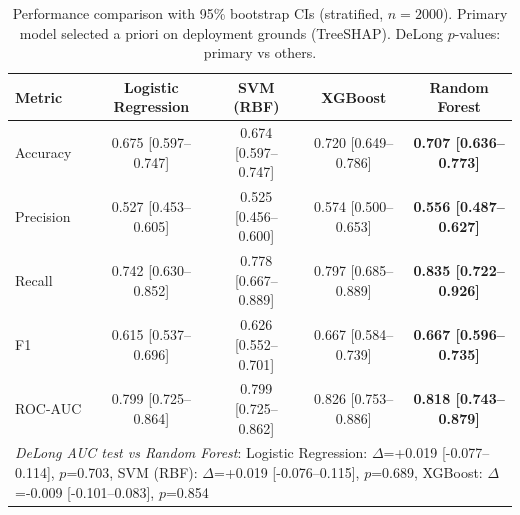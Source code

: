 \begin{table}[!t]
\centering
\small
\setlength{\tabcolsep}{3pt}
\caption{Performance comparison with 95\% bootstrap CIs (stratified, $n=2000$). Primary model selected a priori on deployment grounds (TreeSHAP). DeLong $p$-values: primary vs others.}
\label{tab:comparison_ci}
\begin{tabular}{lcccc}
\toprule
Metric & Logistic Regression & SVM (RBF) & XGBoost & \textbf{Random Forest} \\
\midrule
Accuracy & 0.675 [0.597--0.747] & 0.674 [0.597--0.747] & 0.720 [0.649--0.786] & \textbf{0.707 [0.636--0.773]} \\
Precision & 0.527 [0.453--0.605] & 0.525 [0.456--0.600] & 0.574 [0.500--0.653] & \textbf{0.556 [0.487--0.627]} \\
Recall & 0.742 [0.630--0.852] & 0.778 [0.667--0.889] & 0.797 [0.685--0.889] & \textbf{0.835 [0.722--0.926]} \\
F1 & 0.615 [0.537--0.696] & 0.626 [0.552--0.701] & 0.667 [0.584--0.739] & \textbf{0.667 [0.596--0.735]} \\
ROC-AUC & 0.799 [0.725--0.864] & 0.799 [0.725--0.862] & 0.826 [0.753--0.886] & \textbf{0.818 [0.743--0.879]} \\
\midrule
\multicolumn{5}{l}{\textit{DeLong AUC test vs Random Forest}: Logistic Regression: $\Delta$=+0.019 [-0.077--0.114], $p$=0.703, SVM (RBF): $\Delta$=+0.019 [-0.076--0.115], $p$=0.689, XGBoost: $\Delta$=-0.009 [-0.101--0.083], $p$=0.854} \\
\bottomrule
\end{tabular}
\end{table}